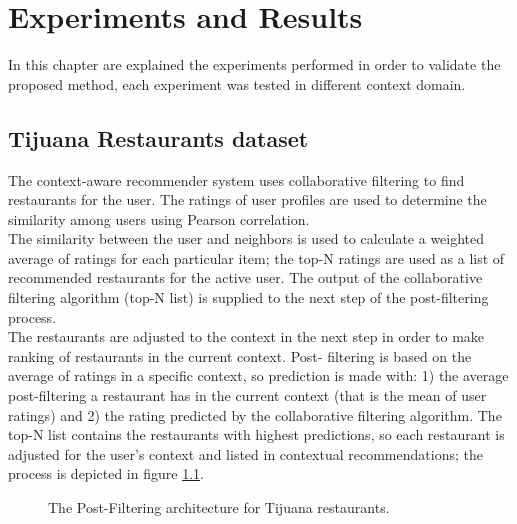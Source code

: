 \chapter{Experiments and Results} \label{results}


In this chapter are explained the experiments performed in order to
validate the proposed method, each experiment was tested in different
context domain.

\section{Tijuana Restaurants dataset} 

The context-aware recommender system  
uses collaborative filtering to find restaurants for the
user\cite{ramirez2013restaurant}. The ratings of user profiles are
used to determine the similarity among users using Pearson correlation. \\   
The similarity between the user and  neighbors is used to calculate a
weighted average of ratings for each particular item;  the top-N
ratings are used as a list of recommended restaurants for the active
user. The output of the collaborative filtering algorithm (top-N list)
is supplied to the next step of the post-filtering process. \\   The
restaurants are adjusted to the context in the next step in order to
make ranking of restaurants in the current context. Post- filtering is
based on the average of ratings in a specific context, so prediction
is made with: 1) the average post-filtering a restaurant has in the
current context (that is the mean of user ratings) and 2) the rating
predicted by the collaborative filtering algorithm. The top-N list
contains the restaurants with highest predictions, so each restaurant
is adjusted for the user’s context and listed in contextual
recommendations; the process is depicted in figure
\ref{fig:postfiltering}.
\begin{figure}
\centering
\captionsetup{font=footnotesize}
\setlength\fboxsep{0pt}
\caption{The Post-Filtering architecture for Tijuana restaurants.}
\label{fig:postfiltering}     
\end{figure}

